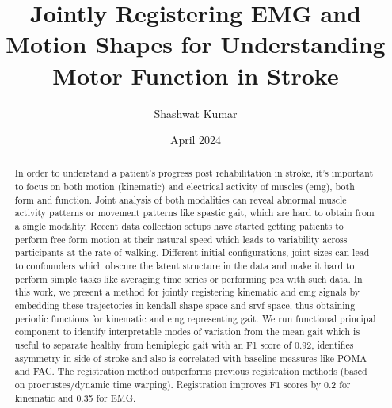 \documentclass{article}
\title{Jointly Registering EMG and Motion Shapes for Understanding Motor Function in Stroke}
\author{Shashwat Kumar}
\date{April 2024}
\newcommand{\shashwat}[1]{\textcolor{blue}{shashwat: #1 \\}}
\begin{document}
\maketitle







\begin{abstract}
    In order to understand a patient's progress post rehabilitation in stroke, it's important to focus on both motion (kinematic) and electrical activity of muscles (emg), both form and function. Joint analysis of both modalities can reveal abnormal  muscle activity patterns or movement patterns like spastic gait, which are hard to obtain from a single modality. Recent data collection setups have started getting patients to perform free form motion at their natural speed which leads to variability across participants at the rate of walking. Different initial configurations, joint sizes can lead to confounders which obscure the latent structure in the data and make it hard to perform simple tasks like averaging time series or performing pca with such data. In this work, we present a method for jointly registering kinematic and emg signals by embedding these trajectories in kendall shape space and srvf space, thus obtaining periodic functions for kinematic and emg representing gait.  We run functional principal component to identify interpretable modes of variation from the mean gait which is useful to separate healthy from hemiplegic gait with an F1 score of 0.92, identifies asymmetry in side of stroke and also is correlated with baseline measures like POMA and FAC. The registration method outperforms previous registration methods (based on procrustes/dynamic time warping). Registration improves F1 scores by 0.2 for kinematic and 0.35 for EMG.
\end{abstract}
\end{document}
